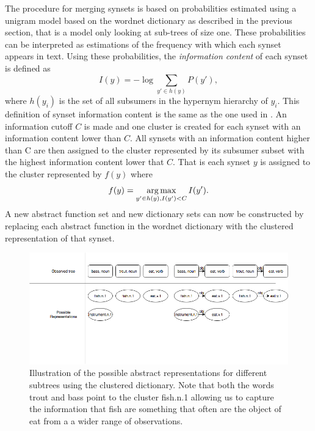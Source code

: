 The procedure for merging synsets is based on probabilities estimated using a unigram model based on the wordnet dictionary as described in the previous section, that is a model only looking at sub-trees of size one. These probabilities can be interpreted as estimations of the frequency with which each synset appears in text. Using these probabilities, the \emph{information content} of each synset is defined as
\begin{equation}
    I(y)=-\log\sum_{y'\in h(y)} P(y'),
\end{equation}
where $h(y_i)$ is the set of all subsumers in the hypernym hierarchy of $y_i$. This definition of synset information content is the same as the one used in \citep{resnik1995similarity}. An information cutoff $C$ is made and one cluster is created for each synset with an information content lower than $C$. All synsets with an information content higher than C are then assigned to the cluster represented by its subsumer subset with the highest information content lower that $C$. That is each synset $y$ is assigned to the cluster represented by $f(y)$ where
\begin{equation}
    f(y)=\operatorname*{arg\,max}_{y'\in h(y), I(y')<C} I(y').
\end{equation}
A new abstract function set and new dictionary sets can now be constructed by replacing each abstract function in the wordnet dictionary with the clustered representation of that synset.
\begin{figure}[!htbp]
\includegraphics[width=\linewidth]{figure/clust_poss_subtrees.png}
\caption{Illustration of the possible abstract representations for different subtrees using the clustered dictionary. Note that both the words trout and bass point to the cluster fish.n.1 allowing us to capture the information that fish are something that often are the object of eat from a a wider range of observations.}
\label{fig:ast}
\end{figure}
